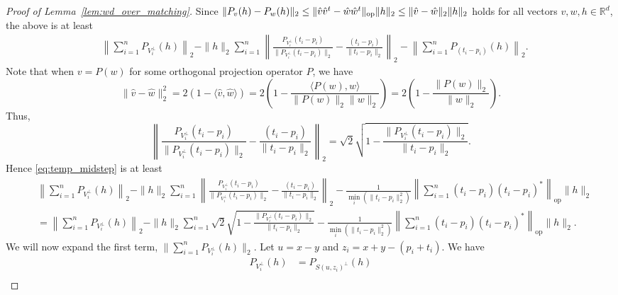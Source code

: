 \begin{proof}[Proof of Lemma~\ref{lem:wd_over_matching}]
Since $ \|P_v(h) - P_w (h) \|_2 \leq \| \hat{v} \hat{v}^t - \hat{w} \hat{w}^t\|_\text{op} \|h\|_2  \leq  \| \hat{v} - \hat{w} \|_2 \|h\|_2 $ holds for all vectors $v,w,h \in \mathbb{R}^d$, the above is at least
\begin{align} \label{eq:temp_midstep}
& \left\| \sum_{i=1}^n P_{V_i^\perp}( h)\right\|_2 - \|h\|_2 \sum_{i=1}^n \left \| \frac{P_{V_i^\perp}(t_i-p_i)}{\|P_{V_i^\perp}(t_i-p_i)\|_2} - \frac{(t_i-p_i)}{\|t_i - p_i\|_2}  \right \|_2 - \left\|\sum_{i=1}^n P_{(t_i-p_i)}(h)\right\|_2.
\end{align}
Note that when $v = P(w)$ for some orthogonal projection operator $P$, we have
\[
\| \hat{v} - \hat{w}\|_2^2 = 2\left(1-\langle \hat{v},\hat{w} \rangle\right) = 2\left(1 - \frac{\langle  P(w), w \rangle}{\|P(w)\|_2 \|w\|_2}\right) = 2\left(1- \frac{\|P(w)\|_2}{\|w\|_2}\right).
\]
Thus,
\[
\left \| \frac{P_{V_i^\perp}(t_i-p_i)}{\|P_{V_i^\perp}(t_i-p_i)\|_2} - \frac{(t_i-p_i)}{\|t_i - p_i\|_2}  \right \|_2 = \sqrt{2}\sqrt{1 - \frac{\| P_{V_i^\perp} (t_i-p_i) \|_2}{\|t_i-p_i\|_2}}.
\]
Hence \eqref{eq:temp_midstep} is at least
\begin{align*}
& \left\| \sum_{i=1}^n P_{V_i^\perp}( h)\right\|_2 -  \|h\|_2 \sum_{i=1}^n \left \| \frac{P_{V_i^\perp}(t_i-p_i)}{\|P_{V_i^\perp}(t_i-p_i)\|_2} - \frac{(t_i-p_i)}{\|t_i - p_i\|_2}  \right \|_2 - \frac{1}{\min_i(\|t_i - p_i\|_2^2)}\left \|\sum_{i=1}^n (t_i-p_i)(t_i-p_i)^*\right\|_{\text{op}} \|h\|_2\\
&= \left\| \sum_{i=1}^n P_{V_i^\perp}( h)\right\|_2 -  \|h\|_2 \sum_{i=1}^n \sqrt{2}\sqrt{1 - \frac{\| P_{V_i^\perp} (t_i-p_i) \|_2}{\|t_i-p_i\|_2}} - \frac{1}{\min_i(\|t_i - p_i\|_2^2)}\left \|\sum_{i=1}^n (t_i-p_i)(t_i-p_i)^*\right\|_{\text{op}} \|h\|_2.
\end{align*}
We will now expand the first term, $\| \sum_{i=1}^n P_{V_i^\perp}( h)\|_2$. Let $u = x-y$ and $z_i = x+y - (p_i + t_i)$. We have
\begin{align*}
P_{V_i^\perp}( h) &= P_{S(u,z_i)^\perp}(h)\\

\end{align*}
\end{proof}
